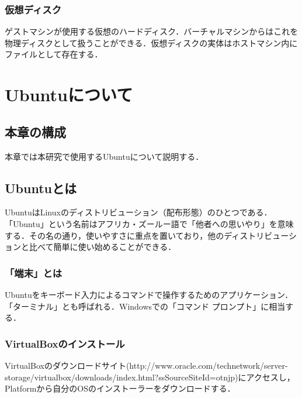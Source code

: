 \subsection{仮想ディスク}
ゲストマシンが使用する仮想のハードディスク．バーチャルマシンからはこれを物理ディスクとして扱うことができる．仮想ディスクの実体はホストマシン内にファイルとして存在する．

\chapter{Ubuntuについて}

\section{本章の構成}

本章では本研究で使用するUbuntuについて説明する．

\section{Ubuntuとは}
UbuntuはLinuxのディストリビューション（配布形態）のひとつである．「Ubuntu」という名前はアフリカ・ズールー語で「他者への思いやり」を意味する．その名の通り，使いやすさに重点を置いており，他のディストリビューションと比べて簡単に使い始めることができる．

\subsection{「端末」とは}
Ubuntuをキーボード入力によるコマンドで操作するためのアプリケーション．「ターミナル」とも呼ばれる．Windowsでの「コマンド プロンプト」に相当する．

\subsection{VirtualBoxのインストール}

VirtualBoxのダウンロードサイト(http://www.oracle.com/technetwork/server-storage/virtualbox/downloads/index.html?ssSourceSiteId=otnjp)にアクセスし，Platformから自分のOSのインストーラーをダウンロードする．

